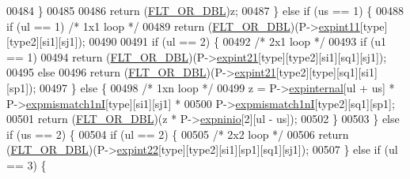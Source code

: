 \begin{DoxyCode}
00484       \}
00485 
00486       \textcolor{keywordflow}{return} (\mbox{\hyperlink{group__data__structures_ga31125aeace516926bf7f251f759b6126}{FLT\_OR\_DBL}})z;
00487     \} \textcolor{keywordflow}{else} \textcolor{keywordflow}{if} (us == 1) \{
00488       \textcolor{keywordflow}{if} (ul == 1)                     \textcolor{comment}{/* 1x1 loop */}
00489         \textcolor{keywordflow}{return} (\mbox{\hyperlink{group__data__structures_ga31125aeace516926bf7f251f759b6126}{FLT\_OR\_DBL}})(P->\mbox{\hyperlink{group__energy__parameters_ae58abb197b8bfb624513cb28858a8dab}{expint11}}[type][type2][si1][sj1]);
00490 
00491       \textcolor{keywordflow}{if} (ul == 2) \{
00492         \textcolor{comment}{/* 2x1 loop */}
00493         \textcolor{keywordflow}{if} (u1 == 1)
00494           \textcolor{keywordflow}{return} (\mbox{\hyperlink{group__data__structures_ga31125aeace516926bf7f251f759b6126}{FLT\_OR\_DBL}})(P->\mbox{\hyperlink{group__energy__parameters_acb992a6f846f0d1720b111606d819164}{expint21}}[type][type2][si1][sq1][sj1]);
00495         \textcolor{keywordflow}{else}
00496           \textcolor{keywordflow}{return} (\mbox{\hyperlink{group__data__structures_ga31125aeace516926bf7f251f759b6126}{FLT\_OR\_DBL}})(P->\mbox{\hyperlink{group__energy__parameters_acb992a6f846f0d1720b111606d819164}{expint21}}[type2][type][sq1][si1][sp1]);
00497       \} \textcolor{keywordflow}{else} \{
00498         \textcolor{comment}{/* 1xn loop */}
00499         z = P->\mbox{\hyperlink{group__energy__parameters_aa98c3f4a62b997c9a460876c75d2d1ea}{expinternal}}[ul + us] * P->\mbox{\hyperlink{group__energy__parameters_ae64727c998a64d8a6f958ef364eda821}{expmismatch1nI}}[type][si1][sj1] *
00500             P->\mbox{\hyperlink{group__energy__parameters_ae64727c998a64d8a6f958ef364eda821}{expmismatch1nI}}[type2][sq1][sp1];
00501         \textcolor{keywordflow}{return} (\mbox{\hyperlink{group__data__structures_ga31125aeace516926bf7f251f759b6126}{FLT\_OR\_DBL}})(z * P->\mbox{\hyperlink{group__energy__parameters_aa02a086c6fce358c984a9685d0c4ece7}{expninio}}[2][ul - us]);
00502       \}
00503     \} \textcolor{keywordflow}{else} \textcolor{keywordflow}{if} (us == 2) \{
00504       \textcolor{keywordflow}{if} (ul == 2) \{
00505         \textcolor{comment}{/* 2x2 loop */}
00506         \textcolor{keywordflow}{return} (\mbox{\hyperlink{group__data__structures_ga31125aeace516926bf7f251f759b6126}{FLT\_OR\_DBL}})(P->\mbox{\hyperlink{group__energy__parameters_aa8e5d06b019fb91bf7f1b866e5349fb6}{expint22}}[type][type2][si1][sp1][sq1][sj1]);
00507       \} \textcolor{keywordflow}{else} \textcolor{keywordflow}{if} (ul == 3) \{

\end{DoxyCode}
